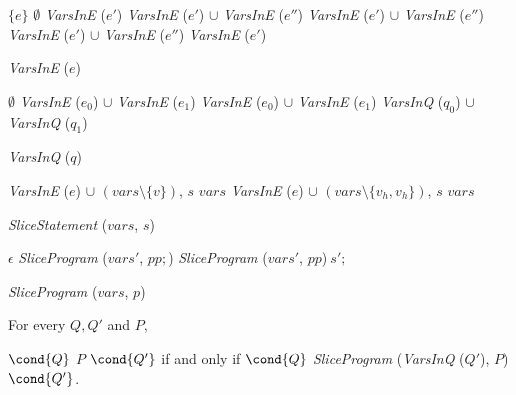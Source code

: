 
\begin{algorithm}
  \begin{algorithmic}[1]
        $\{ e \}$
      \EndCase
        $\emptyset$
      \EndCase
        \textit{VarsInE} ($e'$)
      \EndCase
        \textit{VarsInE} ($e'$) $\cup$ \textit{VarsInE} ($e''$)
      \EndCase
        \textit{VarsInE} ($e'$) $\cup$ \textit{VarsInE} ($e''$)
      \EndCase
        \textit{VarsInE} ($e'$) $\cup$ \textit{VarsInE} ($e''$)
      \EndCase
        \textit{VarsInE} ($e'$)
      \EndCase
    \EndMatch
  \end{algorithmic}
  \caption{\textit{VarsInE} ($e$)}
\end{algorithm}

\begin{algorithm}
\begin{algorithmic}[1]
    \Case{$\top$}
      $\emptyset$
    \EndCase
      \textit{VarsInE} ($e_0$) $\cup$ \textit{VarsInE} ($e_1$)
    \EndCase
      \textit{VarsInE} ($e_0$) $\cup$ \textit{VarsInE} ($e_1$)
    \EndCase
      \textit{VarsInQ} ($q_0$) $\cup$ \textit{VarsInQ} ($q_1$)
    \EndCase
  \EndMatch
\end{algorithmic}
\caption{\textit{VarsInQ} ($q$)}
\end{algorithm}

\begin{algorithm}
  \begin{algorithmic}[1]
          {\textit{VarsInE} ($e$) $\cup$ $(\mathit{vars} \setminus \{
            v \})$, $s$}
          {$\mathit{vars}$}
      \EndCase
          {\textit{VarsInE} ($e$) $\cup$ $(\mathit{vars} \setminus \{
            v_h, v_h \})$, $s$}
          {$\mathit{vars}$}
      \EndCase
    \EndMatch
  \end{algorithmic}
  \caption{\textit{SliceStatement} ($\mathit{vars}$, $s$)}
\end{algorithm}

\begin{algorithm}
  \begin{algorithmic}[1]
      \Case{$\epsilon$}
        $\epsilon$
      \EndCase
            \textit{SliceProgram} ($\mathit{vars}'$, $pp;$)
          \EndCase
            \textit{SliceProgram} ($\mathit{vars}'$, $pp$)$\ s';$
          \EndCase
        \EndMatch
      \EndCase
    \EndMatch
  \end{algorithmic}
  \caption{\textit{SliceProgram} ($\mathit{vars}$, $p$)}
\end{algorithm}

\begin{theorem}
  For every $Q, Q'$ and $P$,
  \begin{center}
  $\cond{Q}$ $P$ $\cond{Q'}$ if and only if
  $\cond{Q}$ \textit{SliceProgram} (\textit{VarsInQ} ($Q'$), $P$)
  $\cond{Q'}$.
  \end{center}

\end{theorem}